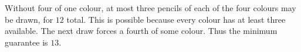 Without four of one colour, at most three pencils of each of the four colours may be drawn, for $12$ total. This is possible because every colour has at least three available. The next draw forces a fourth of some colour. Thus the minimum guarantee is $\boxed{13}$.
